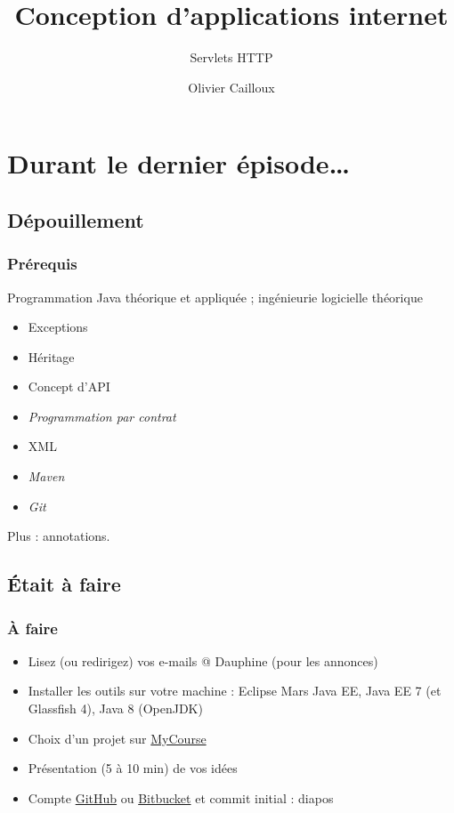 \documentclass[english, french]{beamer}
\title{Conception d’applications internet}
\subtitle{Servlets HTTP}
\author{Olivier Cailloux}
\institute[LAMSADE]{LAMSADE, Université Paris-Dauphine}
\date{\formatdate{7}{12}{2015}}
\begin{document}


\begin{frame}[plain]
   \titlepage
\end{frame}
\addtocounter{framenumber}{-1}

\section[Dernier épisode]{Durant le dernier épisode…}
\subsection{Dépouillement}
\begin{frame}
	\frametitle{Prérequis}
	Programmation Java théorique et appliquée ; ingénieurie logicielle théorique
	\begin{itemize}
		\item Exceptions
		\item Héritage
		\item Concept d’API
		\item \emph{Programmation par contrat}
		\item XML
		\item \emph{Maven}
		\item \emph{Git}
	\end{itemize}
	Plus : annotations.
\end{frame}

\subsection{Était à faire}
\begin{frame}
	\frametitle{À faire}
	\begin{itemize}
		\item Lisez (ou redirigez) vos e-mails @ Dauphine (pour les annonces)
		\item Installer les outils sur votre machine : Eclipse Mars Java EE, Java EE 7 (et Glassfish 4), Java 8 (OpenJDK)
		\item Choix d’un projet sur \href{https://mycourse.dauphine.fr/webapps/blackboard/execute/courseMain?course_id=_34753_1}{MyCourse}
		\item Présentation (5 à 10 min) de vos idées
		\item Compte \href{https://github.com/}{GitHub} ou \href{https://bitbucket.org/}{Bitbucket} et commit initial : diapos
	\end{itemize}
\end{frame}
\end{document}
